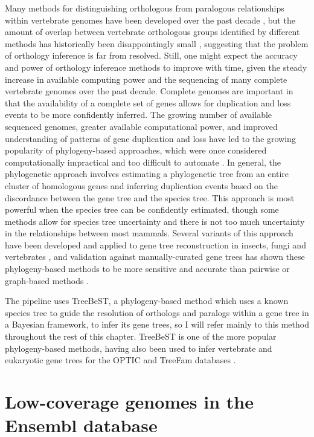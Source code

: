 Many methods for distinguishing orthologous from paralogous
relationships within vertebrate genomes have been developed over the
past decade \citep{Yuan1998,Remm2001}, but the amount of overlap
between vertebrate orthologous groups identified by different methods
has historically been disappointingly small \citep{Chen2007,Jun2009},
suggesting that the problem of orthology inference is far from
resolved. Still, one might expect the accuracy and power of orthology
inference methods to improve with time, given the steady increase in
available computing power and the sequencing of many complete
vertebrate genomes over the past decade. Complete genomes are
important in that the availability of a complete set of genes allows
for duplication and loss events to be more confidently inferred. The
growing number of available sequenced genomes, greater available
computational power, and improved understanding of patterns of gene
duplication and loss have led to the growing popularity of
phylogeny-based approaches, which were once considered computationally
impractical and too difficult to automate \citep{Remm2001}. In
general, the phylogenetic approach involves estimating a phylogenetic
tree from an entire cluster of homologous genes and inferring
duplication events based on the discordance between the gene tree and
the species tree. This approach is most powerful when the species tree
can be confidently estimated, though some methods allow for species
tree uncertainty \citep{Vilella2009} and there is not too much
uncertainty in the relationships between most mammals. Several
variants of this approach have been developed and applied to gene tree
reconstruction in insects, fungi and vertebrates
\citep{Muller2010a,Cepas2007,Datta2009,Vilella2009,Ruan2008,Hahn2007a},
and validation against manually-curated gene trees has shown these
phylogeny-based methods to be more sensitive and accurate than
pairwise or graph-based methods \citep{Datta2009}.

The \cmp pipeline uses TreeBeST, a phylogeny-based method which uses a
known species tree to guide the resolution of orthologs and paralogs
within a gene tree in a Bayesian framework, to infer its gene trees,
so I will refer mainly to this method throughout the rest of this
chapter. TreeBeST is one of the more popular phylogeny-based methods,
having also been used to infer vertebrate and eukaryotic gene trees
for the OPTIC and TreeFam databases
\citep{Heger2008,Ruan2008,Vilella2009}.

\section{Low-coverage genomes in the Ensembl database}
\label{sec_ens_lcv}


